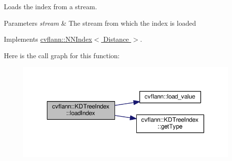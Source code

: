 Loads the index from a stream. 


\begin{DoxyParams}{Parameters}
{\em stream} & The stream from which the index is loaded \\
\hline
\end{DoxyParams}


Implements \hyperlink{classcvflann_1_1NNIndex_a4bcaf48ee2ac65a1b3cebea99d021611}{cvflann\-::\-N\-N\-Index$<$ Distance $>$}.



Here is the call graph for this function\-:\nopagebreak
\begin{figure}[H]
\begin{center}
\leavevmode
\includegraphics[width=340pt]{classcvflann_1_1KDTreeIndex_a2076c89754589df49d24b5d0fa886afc_cgraph}
\end{center}
\end{figure}


